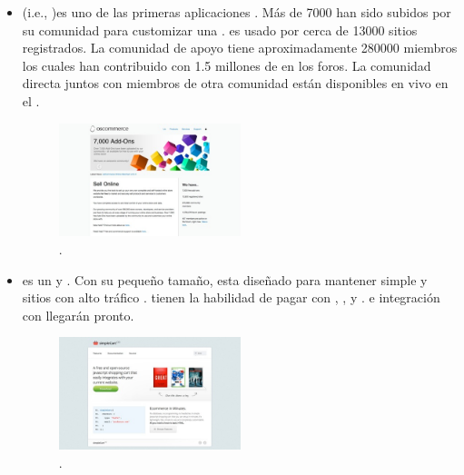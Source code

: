 \begin{itemize}
	\item \textbf{\nameOsCommerce} (i.e., \openSourcePC \commerce)es uno de las primeras aplicaciones \ecommerce \openSourcePC. Más de 7000 \freePC \addOns han sido subidos por su comunidad para customizar una \store \online. \nameOsCommerce es usado por cerca de 13000 sitios registrados. La comunidad de apoyo tiene aproximadamente 280000 miembros los cuales han contribuido con 1.5 millones de \posts en los foros. La comunidad directa juntos con miembros de otra comunidad están disponibles en vivo en el \chat \room.

	\begin{figure}[H]
		\centering
		\includegraphics[width=0.5\textwidth]{figuras/cap1/osCommerceWebsite.jpg}
		\caption{\nameOsCommerce \websiteINT \cite{online_osCommerce}.}
	\end{figure}

	\item \textbf{\nameSimpleCart} es un \freePC y \openSourcePC \javaScriptNAME \shoppingCart. Con su pequeño tamaño, \nameSimpleCart esta diseñado para mantener simple  y sitios con alto tráfico \running \fast. \nameSimpleCart tienen la habilidad de pagar con \paypalCheckout, \googleCheckout, y \amazonPayments. \email \checkoutCOM e integración con \AuthorizeNet llegarán pronto.
	
	\begin{figure}[H]
		\centering
		\includegraphics[width=0.5\textwidth]{figuras/cap1/simpleCartWebsite.jpg}
		\caption{\nameSimpleCart \websiteINT \cite{online_simpleCart}.}
	\end{figure}


\end{itemize}

